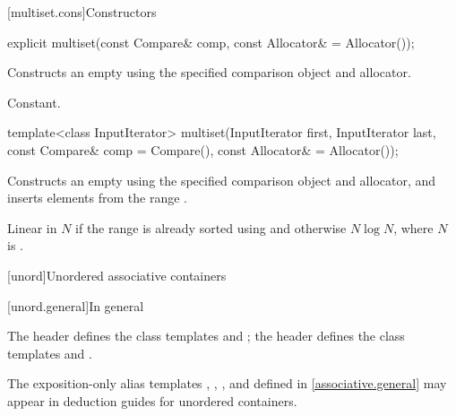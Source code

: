 [multiset.cons]{Constructors}

%
\begin{itemdecl}
explicit multiset(const Compare& comp, const Allocator& = Allocator());
\end{itemdecl}

\begin{itemdescr}
\pnum
\effects
Constructs an empty  using the specified comparison object and allocator.

\pnum
\complexity
Constant.
\end{itemdescr}

%
\begin{itemdecl}
template<class InputIterator>
  multiset(InputIterator first, InputIterator last,
           const Compare& comp = Compare(), const Allocator& = Allocator());
\end{itemdecl}

\begin{itemdescr}
\pnum
\effects
Constructs an empty
using the specified comparison object and allocator,
and inserts elements from the range
.

\pnum
\complexity
Linear in $N$
if the range
is already sorted using  and otherwise $N \log N$,
where $N$ is
.
\end{itemdescr}

[unord]{Unordered associative containers}

[unord.general]{In general}

\pnum
The header  defines the class templates
 and
; the header  defines the class templates
 and .

\pnum
The exposition-only alias templates ,
, , and 
defined in \ref{associative.general} may appear in deduction guides for unordered containers.

